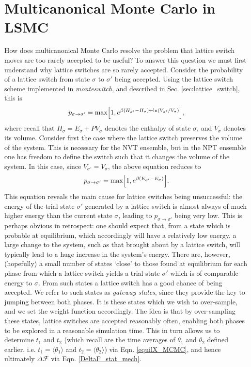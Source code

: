 \documentclass{report}
\begin{document}
\section{Multicanonical Monte Carlo in LSMC}\label{sec:multicanonical_LSMC}
How does multicanonical Monte Carlo resolve the problem that lattice switch moves are too rarely accepted to be useful? To answer this question we must 
first understand why lattice switches are so rarely accepted. 
Consider the probability of a lattice switch from state $\sigma$ to $\sigma'$ being accepted. Using the lattice switch scheme implemented in
\emph{monteswitch}, and described in Sec. \ref{sec:lattice_switch}, this is
\begin{equation}\label{p_LSMC_NPT}
p_{\sigma\to\sigma'}=\text{max}\Bigl[1,e^{\beta(H_{\sigma'}-H_{\sigma})+\ln(V_{\sigma'}/V_{\sigma})}\Bigr],
\end{equation}
where recall that $H_{\sigma}=E_{\sigma}+PV_{\sigma}$ denotes the enthalpy of state $\sigma$, and $V_{\sigma}$ denotes its volume. Consider first the
case where the lattice switch preserves the volume of the system. This is necessary for the NVT ensemble, but in the NPT ensemble one has freedom to
define the switch such that it changes the volume of the system. In this case, since $V_{\sigma'}=V_{\sigma}$, the above equation reduces to
\begin{equation}\label{p_LSMC_NVT}
p_{\sigma\to\sigma'}=\text{max}\Bigl[1,e^{\beta(E_{\sigma'}-E_{\sigma})}\Bigr].
\end{equation}
This equation reveals the main cause for lattice switches being unsuccessful: the energy of the trial state $\sigma'$ generated by a 
lattice switch is almost always of much higher energy than the current state $\sigma$, leading to $p_{\sigma\to\sigma'}$ being very low. 
This is perhaps obvious in retrospect: one should expect that,
from a state which is probable at equilibrium, which accordingly will have a relatively low energy, a large change to the system, such as that 
brought about by a lattice switch, will typically lead to a huge increase in the system's energy. 
%
There are, however, (hopefully) a small number of states `close' to those found at equilibrium for each phase from which a lattice switch yields a 
trial state $\sigma'$ which is of comparable energy to $\sigma$. From such states a lattice switch has a good chance of being accepted.
We refer to such states as \emph{gateway states}, since they provide the key to jumping between both phases. It is these states which we wish to over-sample,
and we set the weight function accordingly. The idea is that by over-sampling these states, lattice switches are accepted reasonably often, 
enabling both phases to be explored in a reasonable simulation time. This in turn allows us to determine
$t_1$ and $t_2$ (which recall are the time averages of $\theta_1$ and $\theta_2$ defined earlier, i.e. $t_1=\langle\theta_1\rangle$ and 
$t_2=\langle\theta_2\rangle$) via Eqn. \eqref{equilX_MCMC}, and hence ultimately $\Delta \mathcal{F}$ via Eqn. \eqref{DeltaF_stat_mech}.
\end{document}
